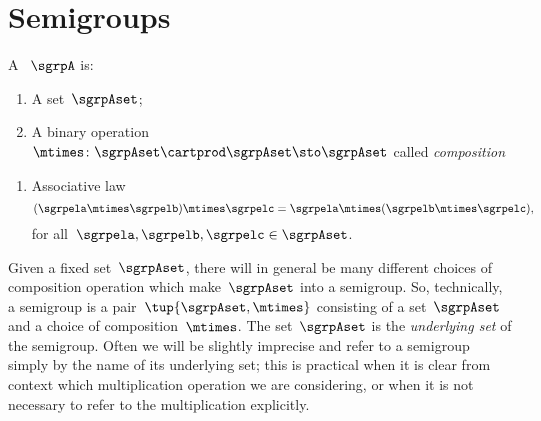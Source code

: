 

\section{Semigroups}
\label{sec:semigroups}

\begin{ctdefinition}[Semigroup]
    \label{def:semigroup}
    A \emph{}~$\sgrpA$ is:
    \begin{body}
        \constit
        \begin{enumerate}
            \item A set~$\sgrpAset$;
            \item A binary operation~$\mtimes  \colon \sgrpAset \cartprod \sgrpAset \sto \sgrpAset$ called \emph{composition}
        \end{enumerate}
        \condit
        \begin{enumerate}
            \item Associative law
            \begin{equation}
                \label{eq:semigroup-associative}
                (\sgrpela \mtimes   \sgrpelb)\mtimes   \sgrpelc
                = \sgrpela \mtimes   (\sgrpelb \mtimes  \sgrpelc),
            \end{equation}
            for all~$\sgrpela , \sgrpelb, \sgrpelc \in \sgrpAset$.
        \end{enumerate}
    \end{body}
\end{ctdefinition}



\begin{remark}
    Given a fixed set~$\sgrpAset$, there will in general be many different choices of composition operation which make~$\sgrpAset$ into a semigroup.
    So, technically, a semigroup is a pair~$\tup{\sgrpAset, \mtimes}$ consisting of a set~$\sgrpAset$ and a choice of composition~$\mtimes$.
    The set~$\sgrpAset$ is the \emph{underlying set} of the semigroup.
    Often we will be slightly imprecise and refer to a semigroup simply by the name of its underlying set;
    this is practical when it is clear from context which multiplication operation we are considering, or when it is not necessary to refer to the multiplication explicitly.
\end{remark}



